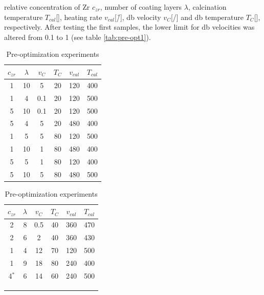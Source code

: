 relative concentration of Zr $c_{zr}$, number of coating layers $\lambda$, calcination temperature $T_{cal}$[\oc{}], heating rate $v_{cal}$[\oc{}/\h{}], \gls{db} velocity $v_{C}$[\mm{}/\s{}] and \gls{db} temperature $T_{C}$[\oc{}], respectively.
After testing the first samples, the lower limit for \gls{db} velocities was altered from 0.1 to 1 (see table \ref{tab:pre-opt1}).
\begin{table}[hbt]
	\centering
	\caption{Pre-optimization experiments  }
	\label{tab:pre-opt}
	\begin{subtable}{0.5\linewidth}
		\centering
		\label{tab:pre-opt1}
		\begin{tabular}{cccccc}
			\hline
			\hline
			$c_{zr}$	&$\lambda$	&$v_{C}$	&$T_{C}$	&$v_{cal}$	&$T_{cal}$		\\
			\hline
	1	&10	&5	&20	&120	&400	\\
	1	&4	&0.1	&20	&120	&500	\\
	5	&10	&0.1	&20	&120	&500	\\
	5	&4	&5	&20	&480	&400	\\
	1	&5	&5	&80	&120	&500	\\
	1	&10	&1	&80	&480	&400	\\
	5	&5	&1	&80	&120	&400	\\
	5	&10	&5	&80	&480	&500	\\
			\hline\hline
		\end{tabular}
	\end{subtable}%
	\begin{subtable}{0.5\linewidth}
		\centering
		\label{tab:pre-opt2}
		\begin{tabular}{cccccc}
			\hline\hline
			$c_{zr}$	&$\lambda$	&$v_{C}$	&$T_{C}$	&$v_{cal}$	&$T_{cal}$		\\
			\hline
	2	&8	&0.5	&40	&360	&470	\\
	2	&6	&2	&40	&360	&430	\\
	1	&4	&12	&70	&120	&500	\\
	1	&9	&18	&80	&240	&400	\\
	4$^*$	&6	&14	&60	&240	&500	\\
			\hline
			\hline
			\\ \\  \\
		\end{tabular}
	\end{subtable}
\end{table}

